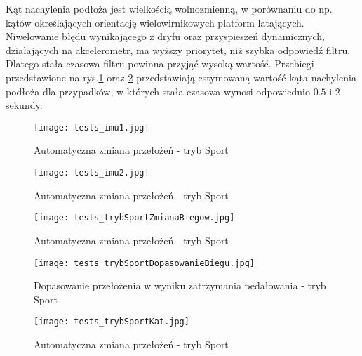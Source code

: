Kąt nachylenia podłoża jest wielkością wolnozmienną, w porównaniu do np. kątów określających orientację wielowirnikowych platform latających. Niwelowanie błędu wynikającego z dryfu oraz przyspieszeń dynamicznych, działających na akcelerometr, ma wyższy priorytet, niż szybka odpowiedź filtru. Dlatego stała czasowa filtru powinna przyjąć wysoką wartość. Przebiegi przedstawione na rys.\ref{fig:tests_imu1} oraz \ref{fig:tests_imu2} przedstawiają estymowaną wartość kąta nachylenia podłoża dla przypadków, w których stała czasowa wynosi odpowiednio $0.5$ i $2$ sekundy. 
\begin{figure}[h]
    \centering
    \texttt{[image: tests\_imu1.jpg]}
    \caption{Automatyczna zmiana przełożeń - tryb Sport}
    \label{fig:tests_imu1}
\end{figure}

\begin{figure}[h]
    \centering
    \texttt{[image: tests\_imu2.jpg]}
    \caption{Automatyczna zmiana przełożeń - tryb Sport}
    \label{fig:tests_imu2}
\end{figure}
\begin{figure}[h]
    \centering
    \texttt{[image: tests\_trybSportZmianaBiegow.jpg]}
    \caption{Automatyczna zmiana przełożeń - tryb Sport}
    \label{fig:tests_sportMode}
\end{figure}

\begin{figure}[h]
    \centering
    \texttt{[image: tests\_trybSportDopasowanieBiegu.jpg]}
    \caption{Dopasowanie przełożenia w wyniku zatrzymania pedałowania - tryb Sport}
    \label{fig:tests_gearSpeedSelection}
\end{figure}




\begin{figure}[h]
    \centering
    \texttt{[image: tests\_trybSportKat.jpg]}
    \caption{Automatyczna zmiana przełożeń - tryb Sport}
    \label{fig:tests_sportMode}
\end{figure}

